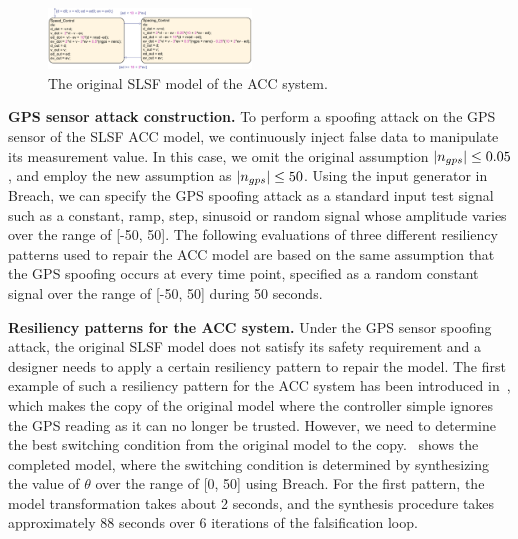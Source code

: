
\begin{figure}[t!]%
	\centering%
    \includegraphics[width=0.48\textwidth]{image/acc_slsf_model}%
	\caption{The original SLSF model of the ACC system.}%
\end{figure}%

\vspace{0.5em}
\noindent
{\bf GPS sensor attack construction.} To perform a spoofing attack on the GPS sensor of the SLSF ACC model, we continuously inject false data to manipulate its measurement value. In this case, we omit the original assumption $|n_{gps}| \leq 0.05$, and employ the new assumption as $|n_{gps}| \leq 50$. Using the input generator in Breach, we can specify the GPS spoofing attack as a standard input test signal such as a constant, ramp, step, sinusoid or random signal whose amplitude varies over the range of [-50, 50]. The following evaluations of three different resiliency patterns used to repair the ACC model are based on the same assumption that the GPS spoofing occurs at every time point, specified as a random constant signal over the range of [-50, 50] during 50 seconds. 


\vspace{0.5em}
\noindent
{\bf Resiliency patterns for the ACC system.} Under the GPS sensor spoofing  attack, the original SLSF model does not satisfy its safety requirement and a designer needs to apply a certain resiliency pattern to repair the model. The first example of such a resiliency pattern for the ACC system has been introduced in~, which makes the copy of the original model where the controller simple ignores the GPS reading as it can no longer be trusted. However, we need to determine the best switching condition from the original model to the copy.~ shows the completed model, where the switching condition is determined by synthesizing the value of $\theta$ over the range of [0, 50] using Breach. For the first pattern, the model transformation takes about 2 seconds, and the synthesis procedure takes approximately 88 seconds over 6 iterations of the falsification loop. %

